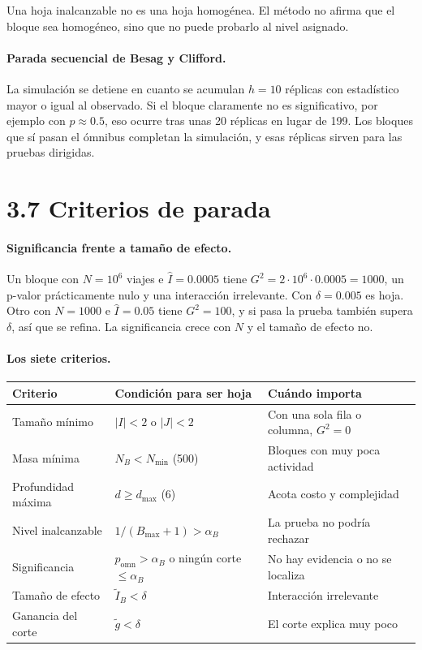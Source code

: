 \documentclass[11pt,a4paper]{article}
\begin{document}
Una hoja inalcanzable no es una hoja homogénea. El método no afirma que el bloque sea
homogéneo, sino que no puede probarlo al nivel asignado.

\paragraph{Parada secuencial de Besag y Clifford.} La simulación se detiene en cuanto
se acumulan $h=10$ réplicas con estadístico mayor o igual al observado. Si el bloque
claramente no es significativo, por ejemplo con $p\approx0.5$, eso ocurre tras unas 20
réplicas en lugar de 199. Los bloques que sí pasan el ómnibus completan la
simulación, y esas réplicas sirven para las pruebas dirigidas.

\section{3.7 Criterios de parada}

\paragraph{Significancia frente a tamaño de efecto.} Un bloque con $N=10^6$ viajes e
$\hat I=0.0005$ tiene $G^2=2\cdot10^6\cdot0.0005=1000$, un p-valor prácticamente
nulo y una interacción irrelevante. Con $\delta=0.005$ es hoja. Otro con $N=1000$ e
$\hat I=0.05$ tiene $G^2=100$, y si pasa la prueba también supera $\delta$, así que se
refina. La significancia crece con $N$ y el tamaño de efecto no.

\paragraph{Los siete criterios.}

\begin{center}
\small
\begin{tabular}{@{}p{3.2cm}p{4.6cm}p{5.4cm}@{}}
\toprule
Criterio & Condición para ser hoja & Cuándo importa \\
\midrule
Tamaño mínimo & $|I|<2$ o $|J|<2$ & Con una sola fila o columna, $G^2=0$ \\
Masa mínima & $N_B<N_{\min}$ (500) & Bloques con muy poca actividad \\
Profundidad máxima & $d\ge d_{\max}$ (6) & Acota costo y complejidad \\
Nivel inalcanzable & $1/(B_{\max}+1)>\alpha_B$ & La prueba no podría rechazar \\
Significancia & $p_{\mathrm{omn}}>\alpha_B$ o ningún corte $\le\alpha_B$ & No hay evidencia o no se localiza \\
Tamaño de efecto & $\tilde I_B<\delta$ & Interacción irrelevante \\
Ganancia del corte & $\tilde g<\delta$ & El corte explica muy poco \\
\bottomrule
\end{tabular}
\end{center}
\end{document}

